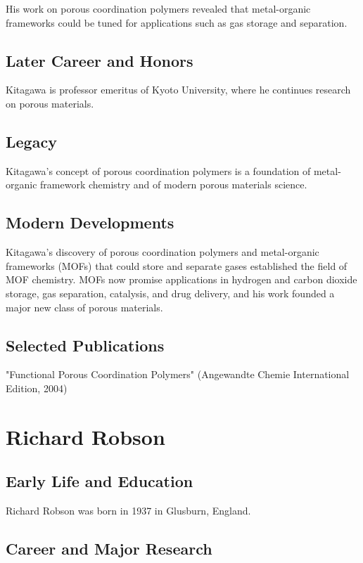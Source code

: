His work on porous coordination polymers revealed that metal-organic frameworks could be tuned for applications such as gas storage and separation.

\subsection*{Later Career and Honors}

Kitagawa is professor emeritus of Kyoto University, where he continues research on porous materials.

\subsection*{Legacy}

Kitagawa's concept of porous coordination polymers is a foundation of metal-organic framework chemistry and of modern porous materials science.

\subsection*{Modern Developments}

Kitagawa's discovery of porous coordination polymers and metal-organic frameworks (MOFs) that could store and separate gases established the field of MOF chemistry. MOFs now promise applications in hydrogen and carbon dioxide storage, gas separation, catalysis, and drug delivery, and his work founded a major new class of porous materials.

\subsection*{Selected Publications}

"Functional Porous Coordination Polymers" (Angewandte Chemie International Edition, 2004)

\clearpage

\section{Richard Robson}

\subsection*{Early Life and Education}

Richard Robson was born in 1937 in Glusburn, England.

\subsection*{Career and Major Research}


